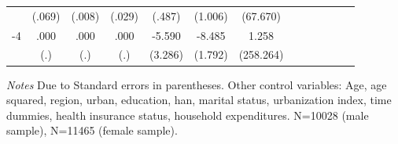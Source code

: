 \begin{table}[p]
\begin{adjustbox}{max width=\linewidth}
\begin{threeparttable}
{\begin{tabular}{l*{6}{SS}}
                &   (.069)         &   (.008)         &   (.029)         &   (.487)         &  (1.006)         & (67.670)         \\
-4             &     .000         &     .000         &     .000         &   -5.590\sym{*}  &   -8.485\sym{***}&    1.258         \\
                &      (.)         &      (.)         &      (.)         &  (3.286)         &  (1.792)         &(258.264)         \\      
\bottomrule
\end{tabular}
\begin{tablenotes}
\item \textit{Notes} Due to    Standard errors in parentheses.
Other control variables: Age, age squared, region, urban, education, han, marital status, urbanization index, time dummies, health insurance status, household expenditures.    N=10028 (male sample), N=11465 (female sample).
\end{tablenotes}
}
\end{threeparttable}
\end{adjustbox}
\end{table}

\clearpage

